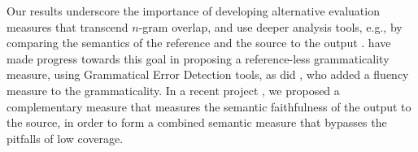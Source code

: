 \documentclass[11pt, a4paper]{article}
\begin{document}
Our results underscore the importance of developing alternative evaluation measures that transcend $n$-gram overlap, 
and use deeper analysis tools, e.g., by comparing
the semantics of the reference and the source to the output \cite[cf.][]{lo2011meant}.
have made progress towards this goal in proposing a reference-less grammaticality measure,
using Grammatical Error Detection tools, as did , who added a fluency measure to the grammaticality.
In a recent project \cite{choshen2018usim}, we proposed a complementary measure that 
measures the semantic faithfulness of the output to the source, in order to form a combined semantic measure that bypasses the pitfalls of low coverage.


\end{document}
